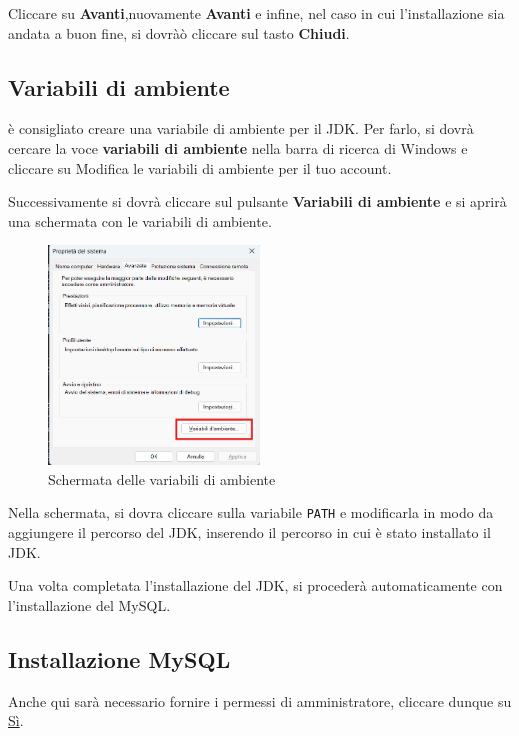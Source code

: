 Cliccare su \textbf{Avanti},nuovamente \textbf{Avanti} e infine, nel caso in cui l'installazione sia andata a buon fine, si dovràò cliccare sul tasto \textbf{Chiudi}.

\subsection{Variabili di ambiente}

è consigliato creare una variabile di ambiente per il JDK. Per farlo, si dovrà cercare la voce \textbf{variabili di ambiente} nella barra di ricerca di Windows e cliccare su {Modifica le variabili di ambiente per il tuo account}.

Successivamente si dovrà cliccare sul pulsante \textbf{Variabili di ambiente} e si aprirà una schermata con le variabili di ambiente. 



\begin{figure}[h!]
    \centering
    \includegraphics[width= 0.5\textwidth]{images/variabili ambienti.png}
    \caption{Schermata delle variabili di ambiente}
\end{figure}

Nella schermata, si dovra cliccare sulla variabile \texttt{PATH} e modificarla in modo da aggiungere il percorso del JDK, inserendo il percorso in cui è stato installato il JDK.

Una volta completata l'installazione del JDK, si procederà automaticamente con l'installazione del MySQL.



\subsection{Installazione MySQL}

Anche qui sarà necessario fornire i permessi di amministratore, cliccare dunque su \underline{Sì}.


